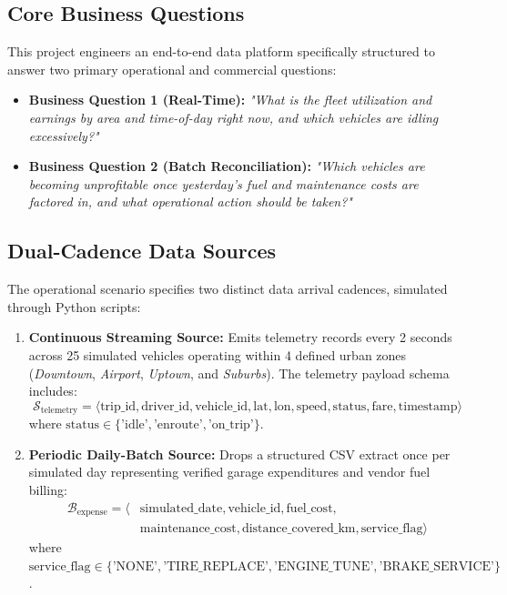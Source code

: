 \documentclass[11pt,a4paper]{article}
\begin{document}
\subsection{Core Business Questions}
This project engineers an end-to-end data platform specifically structured to answer two primary operational and commercial questions:
\begin{itemize}
    \item \textbf{Business Question 1 (Real-Time):} \textit{"What is the fleet utilization and earnings by area and time-of-day right now, and which vehicles are idling excessively?"}
    \item \textbf{Business Question 2 (Batch Reconciliation):} \textit{"Which vehicles are becoming unprofitable once yesterday's fuel and maintenance costs are factored in, and what operational action should be taken?"}
\end{itemize}

\subsection{Dual-Cadence Data Sources}
The operational scenario specifies two distinct data arrival cadences, simulated through Python scripts:
\begin{enumerate}
    \item \textbf{Continuous Streaming Source:} Emits telemetry records every 2 seconds across 25 simulated vehicles operating within 4 defined urban zones (\textit{Downtown}, \textit{Airport}, \textit{Uptown}, and \textit{Suburbs}). The telemetry payload schema includes:
    \begin{equation}
        \mathcal{S}_{\text{telemetry}} = \langle \text{trip\_id}, \text{driver\_id}, \text{vehicle\_id}, \text{lat}, \text{lon}, \text{speed}, \text{status}, \text{fare}, \text{timestamp} \rangle
    \end{equation}
    where $\text{status} \in \{\text{'idle'}, \text{'enroute'}, \text{'on\_trip'}\}$.
    
    \item \textbf{Periodic Daily-Batch Source:} Drops a structured CSV extract once per simulated day representing verified garage expenditures and vendor fuel billing:
    \begin{equation}
    \begin{aligned}
        \mathcal{B}_{\text{expense}} = \langle &\text{simulated\_date}, \text{vehicle\_id}, \text{fuel\_cost}, \\
        &\text{maintenance\_cost}, \text{distance\_covered\_km}, \text{service\_flag} \rangle
    \end{aligned}
    \end{equation}
    where $\text{service\_flag} \in \{\text{'NONE'}, \text{'TIRE\_REPLACE'}, \text{'ENGINE\_TUNE'}, \text{'BRAKE\_SERVICE'}\}$.
\end{enumerate}
\end{document}
